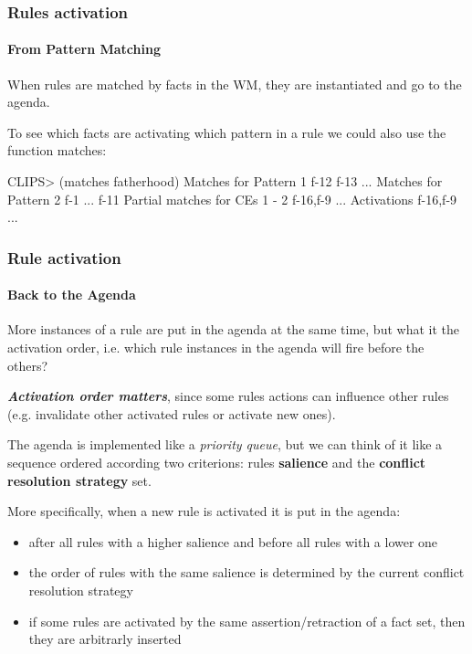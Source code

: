 \documentclass[xcolor={usenames,dvipsnames,svgnames}, compress]{beamer}
\begin{document}
\begin{frame}[fragile]
  \frametitle{Rules activation}
  \framesubtitle{From Pattern Matching}
  When rules are matched by facts in the WM, they are instantiated and
  go to the agenda.\par\bigskip

  To see which facts are activating which pattern in a rule we could also use the
  function \textsf{matches}:
  \begin{clips-code}
    CLIPS> (matches fatherhood)
    Matches for Pattern 1
    f-12
    f-13
    ...
    Matches for Pattern 2
    f-1
    ...
    f-11
    Partial matches for CEs 1 - 2
    f-16,f-9
    ...
    Activations
    f-16,f-9
    ...
  \end{clips-code}
\end{frame}

\begin{frame}
  \frametitle{Rule activation}
  \framesubtitle{Back to the Agenda}
  More instances of a rule are put in the agenda at the same time, but
  what it the activation order, i.e. which rule instances in the
  agenda will fire before the others?\par\bigskip

  \textbf{\emph{Activation order matters}}, since some rules actions can influence
  other rules (e.g. invalidate other activated rules or activate new
  ones).\par\bigskip

  The agenda is implemented like a \emph{priority queue}, but we can
  think of it like a sequence ordered according two criterions: rules \textbf{salience}
  and the \textbf{conflict resolution strategy} set.\par\bigskip

  More specifically, when a new rule is activated it is put in the
  agenda:
  \begin{itemize}
  \item after all rules with a higher salience and before all rules
    with a lower one
    \item the order of rules with the same salience is determined by
      the current conflict resolution strategy
      \item if some rules are activated by the same
        assertion/retraction of a fact set, then they are arbitrarly inserted
  \end{itemize}

\end{frame}
\end{document}
